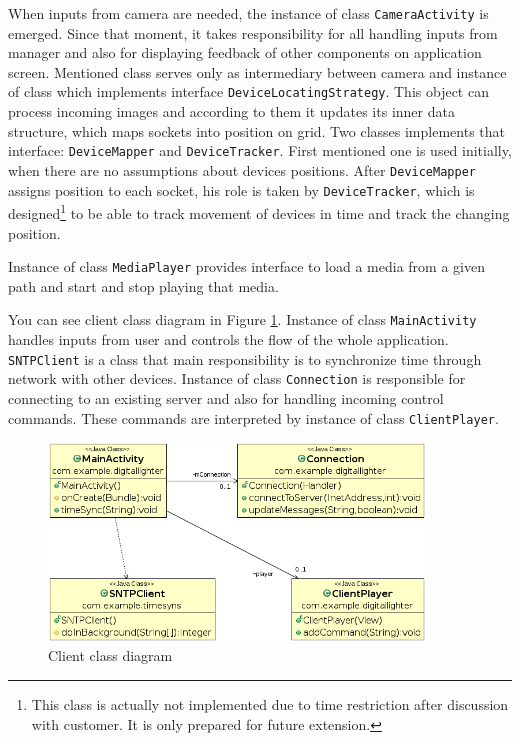 When inputs from camera are needed, the instance of class \texttt{CameraActivity} is emerged.
Since that moment, it takes responsibility for all handling inputs from manager and also for displaying feedback of other components on application screen.
Mentioned class serves only as intermediary between camera and instance of class which implements interface \texttt{DeviceLocatingStrategy}.
This object can process incoming images and according to them it updates its inner data structure, which maps sockets into position on grid.
Two classes implements that interface: \texttt{DeviceMapper} and \texttt{DeviceTracker}.
First mentioned one is used initially, when there are no assumptions about devices positions.
After \texttt{DeviceMapper} assigns position to each socket, his role is taken by \texttt{DeviceTracker}, which is designed\footnote{This class is actually not implemented due to time restriction after discussion with customer. It is only prepared for future extension.} to be able to track movement of devices in time and track the changing position.

Instance of class \texttt{MediaPlayer} provides interface to load a media from a given path and start and stop playing that media.

You can see client class diagram in Figure \ref{fig:architecture_class_diagram_client}.
Instance of class \texttt{MainActivity} handles inputs from user and controls the flow of the whole application.
\texttt{SNTPClient} is a class that main responsibility is to synchronize time through network with other devices.
Instance of class \texttt{Connection} is responsible for connecting to an existing server and also for handling incoming control commands.
These commands are interpreted by instance of class \texttt{ClientPlayer}.

\begin{figure}[!h]
	\centering
		\includegraphics[width=10cm]{softwareArchitecture/class_diagram_client.png}
	\caption{Client class diagram}
	\label{fig:architecture_class_diagram_client}
\end{figure}


